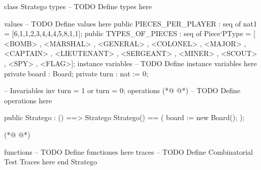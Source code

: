 \begin{vdmpp}[breaklines=true]
class Stratego
types
-- TODO Define types here
  
values
  -- TODO Define values here
  public PIECES_PER_PLAYER : seq of nat1 = [6,1,1,2,3,4,4,4,5,8,1,1];
  public TYPES_OF_PIECES : seq of Piece`PType = [ <BOMB> , <MARSHAL> , <GENERAL> , <COLONEL> , <MAJOR> , <CAPTAIN> , <LIEUTENANT> , <SERGEANT> , <MINER> , <SCOUT> , <SPY> , <FLAG>];
instance variables
-- TODO Define instance variables here
  private board : Board;
  private turn : nat := 0;
  
  -- Invariables
  inv turn = 1 or turn = 0;
operations
(*@
\label{Stratego:17}
@*)
-- TODO Define operations here

  public Stratego : () ==> Stratego
  Stratego() ==
  (
   board := new Board();
  );
  
(*@
\label{placePieces:25}
@*)
  
functions
-- TODO Define functiones here
traces
-- TODO Define Combinatorial Test Traces here
end Stratego
\end{vdmpp}
